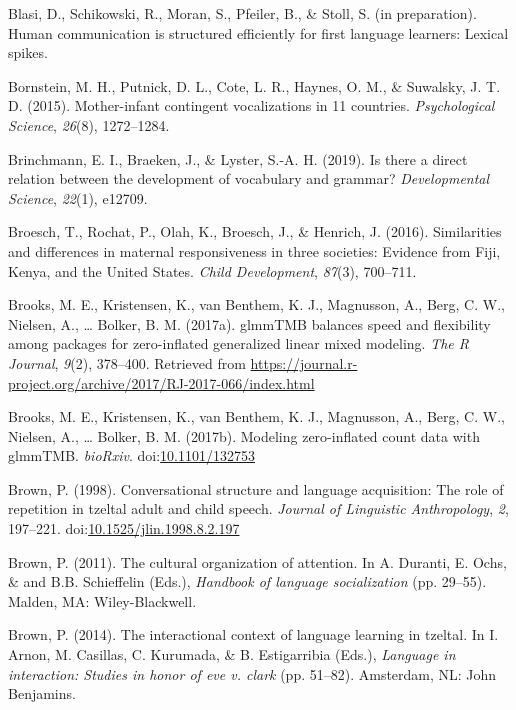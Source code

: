 \documentclass[floatsintext,man]{apa6}
\theoremstyle{definition}
\theoremstyle{definition}
\theoremstyle{definition}
\theoremstyle{remark}
\begin{document}
\hypertarget{ref-blasiIPhuman}{}
Blasi, D., Schikowski, R., Moran, S., Pfeiler, B., \& Stoll, S. (in
preparation). Human communication is structured efficiently for first
language learners: Lexical spikes.

\hypertarget{ref-bornstein2015mother}{}
Bornstein, M. H., Putnick, D. L., Cote, L. R., Haynes, O. M., \&
Suwalsky, J. T. D. (2015). Mother-infant contingent vocalizations in 11
countries. \emph{Psychological Science}, \emph{26}(8), 1272--1284.

\hypertarget{ref-brinchmann2019direct}{}
Brinchmann, E. I., Braeken, J., \& Lyster, S.-A. H. (2019). Is there a
direct relation between the development of vocabulary and grammar?
\emph{Developmental Science}, \emph{22}(1), e12709.

\hypertarget{ref-broesch2016similarities}{}
Broesch, T., Rochat, P., Olah, K., Broesch, J., \& Henrich, J. (2016).
Similarities and differences in maternal responsiveness in three
societies: Evidence from Fiji, Kenya, and the United States. \emph{Child
Development}, \emph{87}(3), 700--711.

\hypertarget{ref-R-glmmTMB}{}
Brooks, M. E., Kristensen, K., van Benthem, K. J., Magnusson, A., Berg,
C. W., Nielsen, A., \ldots{} Bolker, B. M. (2017a). glmmTMB balances
speed and flexibility among packages for zero-inflated generalized
linear mixed modeling. \emph{The R Journal}, \emph{9}(2), 378--400.
Retrieved from
\url{https://journal.r-project.org/archive/2017/RJ-2017-066/index.html}

\hypertarget{ref-brooks2017modeling}{}
Brooks, M. E., Kristensen, K., van Benthem, K. J., Magnusson, A., Berg,
C. W., Nielsen, A., \ldots{} Bolker, B. M. (2017b). Modeling
zero-inflated count data with glmmTMB. \emph{bioRxiv}.
doi:\href{https://doi.org/10.1101/132753}{10.1101/132753}

\hypertarget{ref-brown1998conversational}{}
Brown, P. (1998). Conversational structure and language acquisition: The
role of repetition in tzeltal adult and child speech. \emph{Journal of
Linguistic Anthropology}, \emph{2}, 197--221.
doi:\href{https://doi.org/10.1525/jlin.1998.8.2.197}{10.1525/jlin.1998.8.2.197}

\hypertarget{ref-brown2011cultural}{}
Brown, P. (2011). The cultural organization of attention. In A. Duranti,
E. Ochs, \& and B.B. Schieffelin (Eds.), \emph{Handbook of language
socialization} (pp. 29--55). Malden, MA: Wiley-Blackwell.

\hypertarget{ref-brown2014interactional}{}
Brown, P. (2014). The interactional context of language learning in
tzeltal. In I. Arnon, M. Casillas, C. Kurumada, \& B. Estigarribia
(Eds.), \emph{Language in interaction: Studies in honor of eve v. clark}
(pp. 51--82). Amsterdam, NL: John Benjamins.
\end{document}
